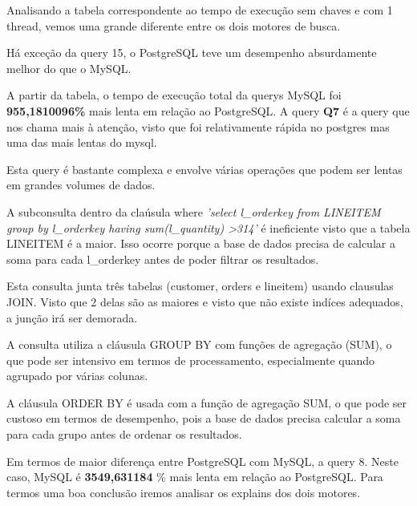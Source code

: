 \documentclass{article}
\begin{document}
Analisando a tabela correspondente ao tempo de execução sem chaves e com 1 thread, vemos uma grande diferente entre os dois motores de busca.

Há exceção da query 15, o PostgreSQL teve um desempenho absurdamente melhor do que o MySQL.

A partir da tabela, o tempo de execução total da querys MySQL foi \textbf{955,1810096\%} mais lenta em relação ao PostgreSQL. A query \textbf{Q7} é a query que nos chama mais à atenção, visto que foi relativamente rápida no postgres mas uma das mais lentas do mysql.

Esta query é bastante complexa e envolve várias operações que podem ser lentas em grandes volumes de dados.

A subconsulta dentro da claúsula where \textit{'select l\_orderkey from LINEITEM group by l\_orderkey having sum(l\_quantity) \textgreater 314'} é ineficiente visto que a tabela LINEITEM é a maior. Isso ocorre porque a base de dados precisa de calcular a soma para cada l\_orderkey antes de poder filtrar os resultados.

Esta consulta junta três tabelas (customer, orders e lineitem) usando clausulas JOIN. Visto que 2 delas são as maiores e visto que não existe indíces adequados, a junção irá ser demorada. 

 A consulta utiliza a cláusula GROUP BY com funções de agregação (SUM), o que pode ser intensivo em termos de processamento, especialmente quando agrupado por várias colunas.

A cláusula ORDER BY é usada com a função de agregação SUM, o que pode ser custoso em termos de desempenho, pois a base de dados precisa calcular a soma para cada grupo antes de ordenar os resultados.


Em termos de maior diferença entre PostgreSQL com MySQL, a query 8. Neste caso, MySQL é \textbf{3549,631184} \% mais lenta em relação ao PostgreSQL.  Para termos uma boa conclusão iremos analisar os explains dos dois motores.\\
\end{document}
